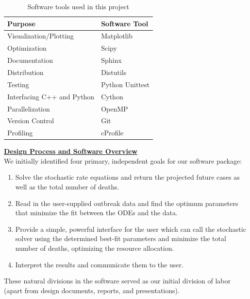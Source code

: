 \documentclass[11pt,letter]{article}
\begin{document}
\begin{table}
\caption{Software tools used in this project}
\begin{center}
	\begin{tabular}{ |l|l| }
	\hline
	\textbf{Purpose} & \textbf{Software Tool} \\ 
	\hline
	Visualization/Plotting & Matplotlib \\
	\hline
	Optimization & Scipy \\
	\hline
	Documentation  & Sphinx \\
	\hline
	Distribution & Distutils \\
        \hline
        Testing  & Python Unittest \\
        \hline
        Interfacing C++ and Python & Cython \\
        \hline
        Parallelization & OpenMP \\
        \hline
        Version Control & Git \\
        \hline
        Profiling & cProfile \\ 
        \hline
	\end{tabular}
\end{center}
\end{table}

\underline{\textbf{Design Process and Software Overview}}\vspace{0.5mm}\\
We initially identified four primary, independent goals for our software package:
\begin{enumerate}
	\item{Solve the stochastic rate equations and return the projected future cases as well as the total number of deaths.}
	\item{Read in the user-supplied outbreak data and find the optimum parameters that minimize the fit between the ODEs and the data.}
	\item{Provide a simple, powerful interface for the user which can call the stochastic solver using the determined best-fit parameters and minimize the total number of deaths, optimizing the resource allocation.}
	\item{Interpret the results and communicate them to the user.}
\end{enumerate}
These natural divisions in the software served as our initial division of labor (apart from design documents, reports, and presentations).\\
\end{document}

